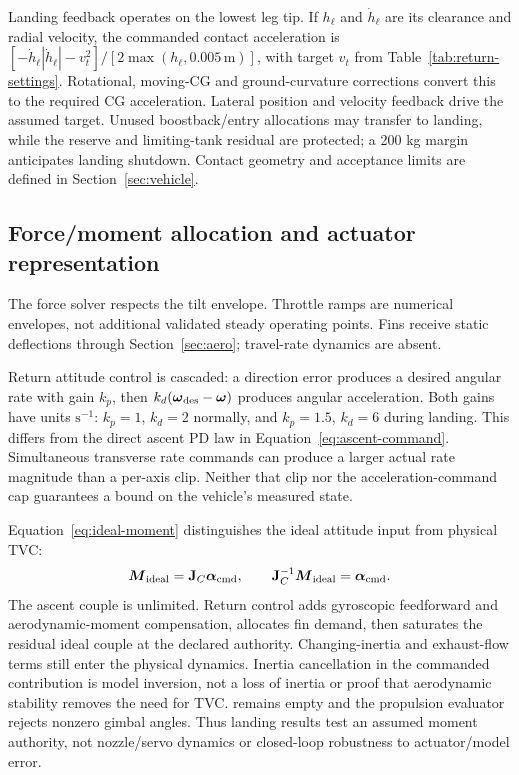Landing feedback operates on the lowest leg tip. If $h_\ell$ and $\dot h_\ell$ are its clearance and radial velocity, the commanded contact acceleration is $[-\dot h_\ell|\dot h_\ell|-v_t^2]/[2\max(h_\ell,0.005\,\mathrm{m})]$, with target $v_t$ from Table~\ref{tab:return-settings}. Rotational, moving-CG and ground-curvature corrections convert this to the required CG acceleration. Lateral position and velocity feedback drive the assumed target. Unused boostback/entry allocations may transfer to landing, while the reserve and limiting-tank residual are protected; a 200 kg margin anticipates landing shutdown. Contact geometry and acceptance limits are defined in Section~\ref{sec:vehicle}.

\subsection{Force/moment allocation and actuator representation}
The force solver respects the tilt envelope. Throttle ramps are numerical envelopes, not additional validated steady operating points. Fins receive static deflections through Section~\ref{sec:aero}; travel-rate dynamics are absent.

Return attitude control is cascaded: a direction error produces a desired angular rate with gain $k_p$, then $k_d(\boldsymbol{\omega}_{\mathrm{des}}-\boldsymbol{\omega})$ produces angular acceleration. Both gains have units $\mathrm{s^{-1}}$: $k_p=1$, $k_d=2$ normally, and $k_p=1.5$, $k_d=6$ during landing. This differs from the direct ascent PD law in Equation~\eqref{eq:ascent-command}. Simultaneous transverse rate commands can produce a larger actual rate magnitude than a per-axis clip. Neither that clip nor the acceleration-command cap guarantees a bound on the vehicle's measured state.

Equation~\eqref{eq:ideal-moment} distinguishes the ideal attitude input from physical TVC:
\begin{equation}
 \boldsymbol{M}_{\mathrm{ideal}}=\mathbf{J}_C\boldsymbol{\alpha}_{\mathrm{cmd}},\qquad
 \mathbf{J}_C^{-1}\boldsymbol{M}_{\mathrm{ideal}}=\boldsymbol{\alpha}_{\mathrm{cmd}}.
\label{eq:ideal-moment}
\end{equation}
The ascent couple is unlimited. Return control adds gyroscopic feedforward and aerodynamic-moment compensation, allocates fin demand, then saturates the residual ideal couple at the declared authority. Changing-inertia and exhaust-flow terms still enter the physical dynamics. Inertia cancellation in the commanded contribution is model inversion, not a loss of inertia or proof that aerodynamic stability removes the need for TVC.  remains empty and the propulsion evaluator rejects nonzero gimbal angles. Thus landing results test an assumed moment authority, not nozzle/servo dynamics or closed-loop robustness to actuator/model error.

